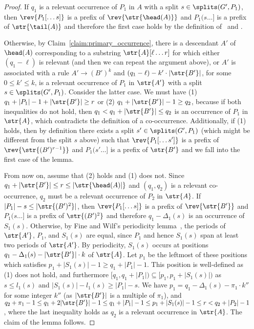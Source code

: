 \begin{proof}
If $q_1$ is a relevant occurrence of $P_1$ in $A$ with a split $s \in \splits(G', P_1)$, then $\rev{P_1[\dots s]}$ is a prefix of $\rev{\str{\head(A)}}$ and $P_1(s \dots ]$ is a prefix of $\str{\tail(A)}$ and therefore the first case holds by the definition of \Tpre\ and \Tsuf. 

Otherwise, by Claim~\ref{claim:primary_occurrence}, there is a descendant $A'$ of $\head(A)$ corresponding to a substring $\str{A}[\ell \dots r]$ for which either $(q_1-\ell)$ is relevant (and then we can repeat the argument above), or $A'$ is associated with a rule $A' \rightarrow (B')^k$ and $(q_1-\ell)-k' \cdot |\str{B'}|$, for some $0 \le k' \le k$, is a relevant occurrence of $P_1$ in $\str{A'}$ with a split $s \in \splits(G',P_1)$. Consider the latter case. We must have (1) $q_1+|P_1|-1+|\str{B'}| \ge r$ or (2) $q_1+|\str{B'}|-1 \ge q_2$, because if both inequalities do not hold, then $q_1 < q_1+|\str{B'}| \le q_2$ is an occurrence of $P_1$ in $\str{A}$, which contradicts the definition of a co-occurrence. Additionally, if (1) holds, then by definition there exists a split $s' \in \splits(G', P_1)$ (which might be different from the split $s$ above) such that $\rev{P_1[ \dots s']}$ is a prefix of $\rev{\str{(B')^{r-1}}}$ and $P_1(s' \dots ]$ is a prefix of $\str{B'}$ and we fall into the first case of the lemma. 

From now on, assume that (2) holds and (1) does not. Since $q_1+|\str{B'}| \le r \le |\str{\head(A)|}$ and $(q_1,q_2)$ is a relevant co-occurrence, $q_2$ must be a relevant occurrence of $P_2$ in $\str{A}$. If $|P_1|-s \le |\str{(B')^2}|$, then $\rev{P_1[ \dots s]}$ is a prefix of $\rev{\str{B'}}$ and $P_1(s \dots ]$ is a prefix of $\str{(B')^2}$ and therefore $q_1-\Delta_1(s)$ is an occurrence of $S_1(s)$. Otherwise, by Fine and Wilf's periodicity lemma~\cite{fine1965uniqueness}, the periods of $\str{A'}$, $P_1$, and $S_1(s)$ are equal, since $P_1$ and hence $S_1(s)$ span at least two periods of $\str{A'}$. By periodicity, $S_1(s)$ occurs at positions $q_1-\Delta_1(s)-|\str{B'}| \cdot k$ of $\str{A}$. Let $p_1$ be the leftmost of these positions which satisfies $p_1+|S_1(s)|-1 \ge q_1+|P_1|-1$. This position is well-defined as (1) does not hold, and furthermore $[q_1,q_1+|P_1|) \subseteq [p_1,p_1+|S_1(s)|)$ as $s \le l_1(s)$ and $|S_1(s)|-l_1(s) \ge |P_1|-s$. We have $p_1 = q_1-\Delta_1(s)-\pi_1 \cdot k''$ for some integer $k''$ (as $|\str{B'}|$ is a multiple of $\pi_1$), and 
$q_2 + \pi_1-1 \le q_1+2|\str{B'}|-1 \le q_1+|P_1|-1 \le p_1+|S_1(s)|-1 \le r < q_2+|P_2|-1$, 
where the last inequality holds as $q_2$ is a relevant occurrence in $\str{A}$. The claim of the lemma follows.
\end{proof}

